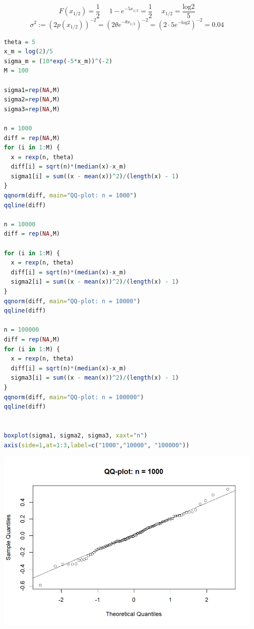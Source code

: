 \documentclass[12pt]{extreport}
\theoremstyle{definiton}
\theoremstyle{definition}
\theoremstyle{definition}
\newcounter{problem}
\renewcommand{\theproblem}{\arabic{problem}}
\newcommand{\problemname}{\color{blue} Задача}
\newenvironment{problem}[1]{
	\addtocounter{problem}{1}\noindent{\large\bfseries \problemname{} \theproblem \,.
		}
}{
	\par\bigskip
}
\begin{document}
\begin{problem}{5}
$$F(x_{1/2}) = \frac{1}{2} \ \ \ \ \ \ 1 - e^{-5x_{1/2}} = \frac{1}{2} \ \ \ \ \ \  x_{1/2} = \frac{\mathrm{log}2}{5}$$
$$\sigma^2 := \left( 2p\left(x_{1/2}\right)\right)^{-2} = \left( 2\theta e^{-\theta x_{1/2}}\right)^{-2} = 
\left( 2 \cdot 5 e^{-\mathrm{log}2}\right)^{-2} = 0.04
$$
\begin{lstlisting}[language=R]
theta = 5
x_m = log(2)/5
sigma_m = (10*exp(-5*x_m))^(-2)
M = 100

sigma1=rep(NA,M)
sigma2=rep(NA,M)
sigma3=rep(NA,M)

n = 1000
diff = rep(NA,M)
for (i in 1:M) {
  x = rexp(n, theta)
  diff[i] = sqrt(n)*(median(x)-x_m)
  sigma1[i] = sum((x - mean(x))^2)/(length(x) - 1)
}
qqnorm(diff, main="QQ-plot: n = 1000")
qqline(diff)

n = 10000
diff = rep(NA,M)

for (i in 1:M) {
  x = rexp(n, theta)
  diff[i] = sqrt(n)*(median(x)-x_m)
  sigma2[i] = sum((x - mean(x))^2)/(length(x) - 1)
}
qqnorm(diff, main="QQ-plot: n = 10000")
qqline(diff)

n = 100000
diff = rep(NA,M)
for (i in 1:M) {
  x = rexp(n, theta)
  diff[i] = sqrt(n)*(median(x)-x_m)
  sigma3[i] = sum((x - mean(x))^2)/(length(x) - 1)
}
qqnorm(diff, main="QQ-plot: n = 100000")
qqline(diff)


boxplot(sigma1, sigma2, sigma3, xaxt="n")
axis(side=1,at=1:3,label=c("1000","10000", "100000"))
\end{lstlisting}
\includegraphics[scale=0.6]{task_3_qqp_n1000.png}


\end{problem}
\end{document}
